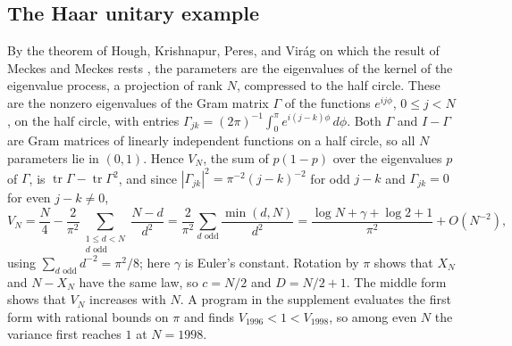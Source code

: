 \documentclass[ECP]{ejpecp}
\begin{document}
\subsection{The Haar unitary example}\label{sec:cue}

By the theorem of Hough, Krishnapur, Peres,
and Vir\'ag on which the result of Meckes and Meckes rests \cite[Theorem~7]{houghkrishnapurperesvirag2006},
the parameters are the eigenvalues of the kernel of the eigenvalue process,
a projection of rank $N$, compressed to the half circle. These are the
nonzero eigenvalues of the Gram matrix $\Gamma$ of the functions
$e^{ij\phi}$, $0\leq j<N$, on the half circle, with entries
$\Gamma_{jk}=(2\pi)^{-1}\int_0^\pi e^{i(j-k)\phi}\,d\phi$. Both
$\Gamma$ and $I-\Gamma$ are Gram matrices of linearly independent functions
on a half circle, so all $N$ parameters lie in $(0,1)$. Hence $V_N$, the
sum of $p(1-p)$ over the eigenvalues $p$ of $\Gamma$, is
$\operatorname{tr}\Gamma-\operatorname{tr}\Gamma^2$, and since
$|\Gamma_{jk}|^2=\pi^{-2}(j-k)^{-2}$ for odd $j-k$ and $\Gamma_{jk}=0$ for
even $j-k\neq0$,
\[
  V_N=\frac N4-\frac2{\pi^2}\sum_{\substack{1\leq d<N\\ d\text{ odd}}}
  \frac{N-d}{d^2}
  =\frac2{\pi^2}\sum_{d\text{ odd}}\frac{\min(d,N)}{d^2}
  =\frac{\log N+\gamma+\log2+1}{\pi^2}+O(N^{-2}),
\]
using $\sum_{d\text{ odd}}d^{-2}=\pi^2/8$; here $\gamma$ is Euler's
constant. Rotation by $\pi$ shows that
$X_N$ and $N-X_N$ have the same law, so $c=N/2$ and $D=N/2+1$. The middle
form shows that $V_N$ increases with $N$. A program in the supplement
evaluates the first form with rational bounds on $\pi$ and finds
$V_{1996}<1<V_{1998}$, so among even $N$ the variance first reaches $1$ at
$N=1998$.
\end{document}
